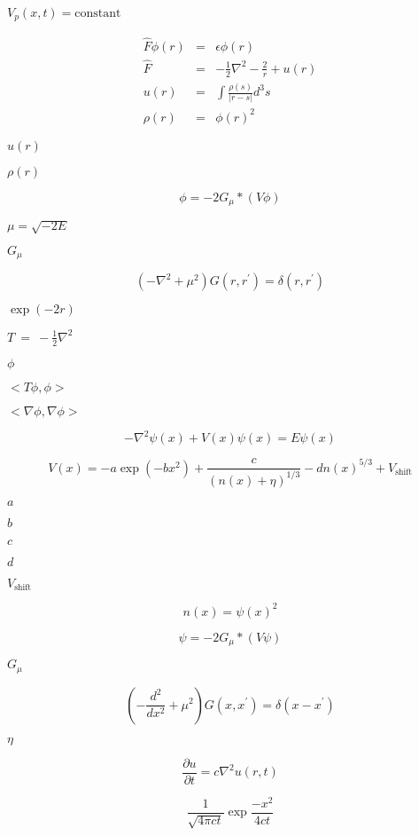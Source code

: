 \documentclass{article}
\begin{document}
$ V_p(x,t)=\mbox{constant} $
\pagebreak

\begin{eqnarray*}
   \hat{F} \phi(r) &=& \epsilon \phi(r) \\
   \hat{F} &=& -\frac{1}{2} \nabla^2 - \frac{2}{r} + u(r) \\
   u(r) &=& \int \frac{\rho(s)}{| r - s |} d^3s \\
   \rho(r) &=& \phi(r)^2
\end{eqnarray*}
\pagebreak

$ u(r) $
\pagebreak

$ \rho(r) $
\pagebreak

\[
    \phi = - 2 G_{\mu} * ( V \phi)
\]
\pagebreak

$ \mu = \sqrt{-2E} $
\pagebreak

$G_{\mu}$
\pagebreak

\[
    \left( - \nabla^2 + \mu^2  \right) G(r,r^{\prime}) = \delta(r,r^{\prime})
\]
\pagebreak

$ \exp(-2r) $
\pagebreak

$T~=~-\frac{1}{2}
\nabla^2 $
\pagebreak

$ \phi $
\pagebreak

$ <T \phi, \phi >
$
\pagebreak

$ < \nabla \phi, \nabla \phi >
$
\pagebreak

\[
-\nabla^2 \psi(x) + V(x) \psi(x) = E \psi(x)
\]
\pagebreak

\[
V(x) = -a \exp(-b x^2) + \frac{c}{(n(x)+\eta)^{1/3}} - d n(x)^{5/3} + V_{\mbox{shift}}
\]
\pagebreak

$ a $
\pagebreak

$ b $
\pagebreak

$ c $
\pagebreak

$ d $
\pagebreak

$ V_{\mbox{shift}} $
\pagebreak

\[
n(x) = \psi(x)^2
\]
\pagebreak

\[
   \psi = - 2 G_{\mu} * \left ( V \psi \right)
\]
\pagebreak

$ G_{\mu}$
\pagebreak

\[
   \left( - \frac{d^2}{dx^2} + \mu^2 \right) G(x,x^{\prime}) = \delta(x-x^{\prime})
\]
\pagebreak

$ \eta $
\pagebreak

\[
\frac{\partial u}{\partial t} = c \nabla^2 u(r,t)
\]
\pagebreak

\[
\frac{1}{\sqrt{4 \pi c t}}  \exp \frac{-x^2}{4 c t}
\]
\pagebreak
\end{document}
